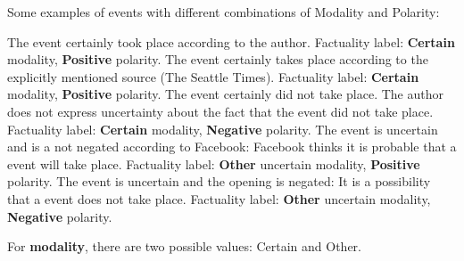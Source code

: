 Some examples of events with different combinations of Modality and Polarity:
\begin{exe}
    \ex {}
        \expl The  event certainly took place according to the author.
        \expl Factuality label: \textbf{Certain} modality, \textbf{Positive} polarity.
    \ex {}
        \expl The  event certainly takes place according to the explicitly mentioned source (The Seattle Times).
        \expl Factuality label: \textbf{Certain} modality, \textbf{Positive} polarity.
    \ex {}
        \expl The  event certainly did not take place. The author does not express uncertainty about the fact that the event did not take place.
        \expl Factuality label: \textbf{Certain} modality, \textbf{Negative} polarity.
    \ex {}
        \expl The  event is uncertain and is a not negated according to Facebook: Facebook thinks it is probable that a  event will take place.
        \expl Factuality label: \textbf{Other} uncertain modality, \textbf{Positive} polarity.
    \ex {}
        \expl The  event is uncertain and the opening is negated: It is a possibility that a  event does not take place.
        \expl Factuality label: \textbf{Other} uncertain modality, \textbf{Negative} polarity.
\end{exe}

\noindent
For \textbf{modality}, there are two possible values: Certain and Other.

